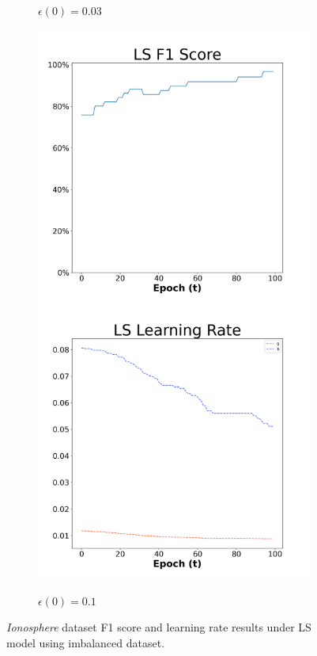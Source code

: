 \begin{figure}[H]
\begin{subfigure}{0.3\textwidth}
  \caption{$\epsilon(0)=0.03$}
\end{subfigure}\hfil %
\begin{subfigure}{0.3\textwidth}
  \includegraphics[width=\linewidth]{images/exper2/Ionosphere/LS_0.1_f1.png}
  \includegraphics[width=\linewidth]{images/exper2/Ionosphere/LS_0.1_lr.png}
  \caption{$\epsilon(0)=0.1$}\label{2ionls1}
\end{subfigure}

\caption{\textit{Ionosphere} dataset F1 score and learning rate results under LS model using imbalanced dataset.}
\end{figure}

